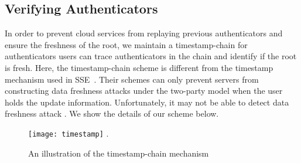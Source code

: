 \subsection{Verifying Authenticators}
In order to prevent cloud services from replaying previous authenticators and ensure the freshness of the root, we maintain a timestamp-chain for authenticators users can trace authenticators in the chain and identify if the root is fresh. %
Here, the timestamp-chain scheme is different from the timestamp mechanism used in SSE~\cite{stefanov2014practical}. Their schemes can only prevent servers from constructing data freshness attacks under the two-party model when the user holds the update information. Unfortunately, it may not be able to detect data freshness attack . We show the details of our scheme below.%

  \begin{figure}[htb]
    \centering
    \texttt{[image: timestamp]}
    \DeclareGraphicsExtensions.
    \caption{An illustration of the timestamp-chain mechanism}
    \label{fig:timestamp}
  \end{figure}

